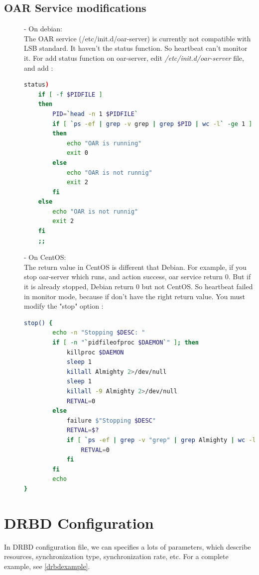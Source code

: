 \documentclass[a4paper,10pt]{report}
\begin{document}
\subsection{OAR Service modifications}
\begin{description}
\item[]- On debian:\\

The OAR service (/etc/init.d/oar-server) is currently not compatible with LSB standard. It haven't the status function. So heartbeat can't monitor it.
For add status function on oar-server, edit \textit{/etc/init.d/oar-server} file, and add :
\begin{lstlisting}[language=bash]
status)
	if [ -f $PIDFILE ]
	then
		PID=`head -n 1 $PIDFILE`
		if [ `ps -ef | grep -v grep | grep $PID | wc -l` -ge 1 ]
		then
			echo "OAR is running"
			exit 0
		else
			echo "OAR is not runnig"
			exit 2
		fi
	else
		echo "OAR is not runnig"
		exit 2
	fi
	;;
\end{lstlisting}

\item[]- On CentOS:\\

The return value in CentOS is different that Debian. For example, if you stop oar-server which runs, and action success, oar service return 0. But if it is already stopped, Debian return 0 but not CentOS. So heartbeat failed in monitor mode, because if don't have the right return value.
You must modify the "stop" option :
\begin{lstlisting}[language=bash]
stop() {
        echo -n "Stopping $DESC: "
        if [ -n "`pidfileofproc $DAEMON`" ]; then
            killproc $DAEMON
            sleep 1
            killall Almighty 2>/dev/null
            sleep 1
            killall -9 Almighty 2>/dev/null
            RETVAL=0
        else
            failure $"Stopping $DESC"
            RETVAL=$?
            if [ `ps -ef | grep -v "grep" | grep Almighty | wc -l` -eq 0 ]; then
                RETVAL=0
            fi
        fi
        echo 
}
\end{lstlisting}
\end{description}

\section{DRBD Configuration}
In DRBD configuration file, we can specifies a lots of parameters, which describe resources, synchronization type, synchronization rate, etc. For a complete example, see \ref{drbdexample}.
\end{document}
